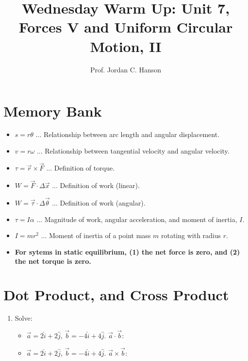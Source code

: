 \documentclass{article}
\begin{document}
\twocolumn

\title{Wednesday Warm Up: Unit 7, Forces V and Uniform Circular Motion, II}
\author{Prof. Jordan C. Hanson}

\maketitle

\section{Memory Bank}

\begin{itemize}
\item $s = r\theta$ ... Relationship between arc length and angular displacement.
\item $v = r\omega$ ... Relationship between tangential velocity and angular velocity.
\item $\tau = \vec{r} \times \vec{F}$ ... Definition of torque.
\item $W = \vec{F} \cdot \Delta \vec{x}$ ... Definition of work (linear).
\item $W = \vec{\tau} \cdot \Delta \vec{\theta}$ ... Definition of work (angular).
\item $\tau = I\alpha$ ... Magnitude of work, angular acceleration, and moment of inertia, $I$.
\item $I = mr^2$ ... Moment of inertia of a point mass $m$ rotating with radius $r$.
\item \textbf{For sytems in static equilibrium, (1) the net force is zero, and (2) the net torque is zero.}
\end{itemize}

\section{Dot Product, and Cross Product}

\begin{enumerate}
\item Solve:
\begin{itemize}
\item $\vec{a} = 2\hat{i} + 2\hat{j}$, $\vec{b} = -4\hat{i} + 4\hat{j}$.  $\vec{a} \cdot \vec{b}$:
\item $\vec{a} = 2\hat{i} + 2\hat{j}$, $\vec{b} = -4\hat{i} + 4\hat{j}$.  $\vec{a} \times \vec{b}$:
\end{itemize}
\vspace{1.5cm}
\end{enumerate}
\end{document}

